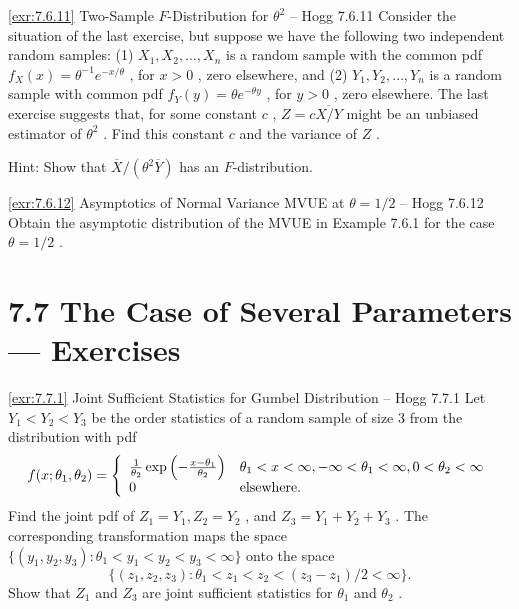 \begin{exercise}{\ref{exr:7.6.11} Two-Sample $F$-Distribution for $\theta^{2}$ – Hogg 7.6.11}\label{exr:7.6.11}
Consider the situation of the last exercise, but suppose we have the following two independent random samples: (1) $X_{1}, X_{2}, \ldots, X_{n}$ is a random sample with the common pdf $f_{X}(x) = \theta^{-1} e^{-x / \theta}$ , for $x > 0$ , zero elsewhere, and (2) $Y_{1}, Y_{2}, \ldots, Y_{n}$ is a random sample with common pdf $f_{Y}(y) = \theta e^{-\theta y}$ , for $y > 0$ , zero elsewhere. The last exercise suggests that, for some constant $c$ , $Z = c \overline{X / Y}$ might be an unbiased estimator of $\theta^2$ . Find this constant $c$ and the variance of $Z$ .

Hint: Show that $\overline{X} /(\theta^2\overline{Y})$ has an $F$-distribution.
\end{exercise}

\begin{exercise}{\ref{exr:7.6.12} Asymptotics of Normal Variance MVUE at $\theta = 1/2$ – Hogg 7.6.12}\label{exr:7.6.12}
Obtain the asymptotic distribution of the MVUE in Example 7.6.1 for the case $\theta = 1/2$ .
\end{exercise}

\section{7.7 The Case of Several Parameters — Exercises}\label{sec:7.7-exercises}

\begin{exercise}{\ref{exr:7.7.1} Joint Sufficient Statistics for Gumbel Distribution – Hogg 7.7.1}\label{exr:7.7.1}
Let $Y_{1} < Y_{2} < Y_{3}$ be the order statistics of a random sample of size 3 from the distribution with pdf
\[
f(x; \theta_1, \theta_2) = \left\{ \begin{array}{l l} \frac{1}{\theta_2} \exp\left(-\frac{x - \theta_1}{\theta_2}\right) & \theta_1 < x < \infty , -\infty < \theta_1 < \infty , 0 < \theta_2 < \infty \\ 0 & \text{elsewhere.} \end{array} \right.
\]
Find the joint pdf of $Z_{1} = Y_{1}, Z_{2} = Y_{2}$ , and $Z_{3} = Y_{1} + Y_{2} + Y_{3}$ . The corresponding transformation maps the space $\{(y_{1}, y_{2}, y_{3}) : \theta_{1} < y_{1} < y_{2} < y_{3} < \infty\}$ onto the space
\[
\{(z_1, z_2, z_3): \theta_1 < z_1 < z_2 < (z_3 - z_1) / 2 < \infty\}.
\]
Show that $Z_{1}$ and $Z_{3}$ are joint sufficient statistics for $\theta_{1}$ and $\theta_{2}$ .
\end{exercise}

